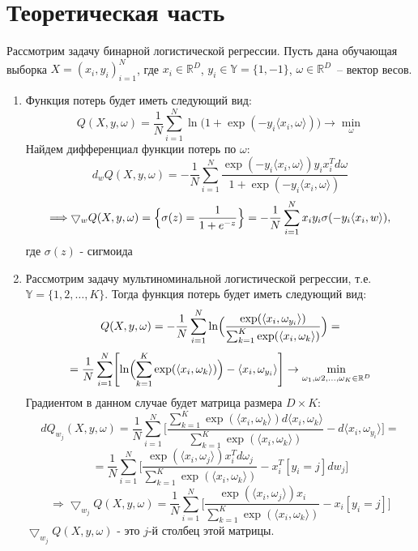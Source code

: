 \section{\huge Теоретическая часть}
Рассмотрим задачу бинарной логистической регрессии. Пусть дана обучающая выборка
$X=(x_i, y_i)_{i=1}^N$, где $x_i \in \mathbb{R}^D$, $ y_i \in \mathbb{Y}=\{ 1, -1\}$, 
$\omega \in \mathbb{R}^D$~-- вектор весов.
\begin{enumerate}
	\item Функция потерь будет иметь следующий вид:
		\[
			Q(X, y, \omega)=\frac{1}{N}\sum_{i=1}^N\ln\bigl(1+\exp(-y_i\langle x_i, \omega\rangle)\bigr)\to \min_{\omega}
		\]
		Найдем дифференциал функции потерь по $\omega$:
		\[
			d_wQ(X, y, \omega)=-\frac{1}{N}\sum_{i=1}^N\frac{\exp(-y_i\langle x_i, \omega\rangle)y_ix_i^Td\omega}
			{1 + \exp(-y_i\langle x_i, \omega\rangle)}
		\]
		$$
			\Longrightarrow \bigtriangledown_wQ(X, y, \omega)=\Bigl\{ \sigma(z) = \frac{1}{ 1+ e^{-z} }\Bigr\}=
			-\frac{1}{N}\sum_{i=1}^Nx_iy_i\sigma(-y_i\langle x_i, w\rangle),
		$$
		где $\sigma(z)$ - сигмоида
	\item Рассмотрим задачу мультиноминальной логистической регрессии, т.е. 
	$\mathbb{Y}=\{1,2,\dots,K\}$. Тогда функция потерь будет иметь следующий вид:
	$$
		Q(X, y, \omega)=-\frac{1}{N}\sum_{i=1}^N\ln\Bigl(\frac{\exp(\langle x_i, 
		\omega_{y_i}\rangle)}{\sum_{k=1}^K\exp(\langle x_i, \omega_k\rangle)}\Bigr)
		=
	$$
	$$
		=\frac{1}{N} \sum_{i=1}^N\Biggl[\ln\Bigl(\sum_{k=1}^K\exp(\langle x_i, \omega_k\rangle)\Bigr)
		- \langle x_i, \omega_{y_i}\rangle\Biggr] \to \min_{\omega_1,\omega2,\dots,\omega_K 
		\in \mathbb{R}^{D}}
	$$
	Градиентом в данном случае будет матрица размера $D \times K$:
	$$
		dQ_{w_j}(X, y, \omega) = \frac{1}{N}\sum_{i=1}^N\Biggl[
			\frac{\sum_{k=1}^K\exp(\langle x_i, \omega_k\rangle)d\langle 
				x_i, \omega_k\rangle}{\sum_{k=1}^K\exp(\langle x_i, \omega_k\rangle)} -
				d\langle x_i,\omega_{y_i}\rangle\Biggr] =
	$$
	$$
		= \frac{1}{N}\sum_{i=1}^N\Biggl[
			\frac{\exp(\langle x_i, \omega_j\rangle)
				x_i^Td\omega_j}{\sum_{k=1}^K\exp(\langle x_i, \omega_k\rangle)} -
				x_i^T[y_i=j]dw_j\Biggr]
	$$
	$$
	\Longrightarrow \bigtriangledown_{w_j}Q(X, y, \omega) = 
		\frac{1}{N}\sum_{i=1}^N\Biggl[
			\frac{\exp(\langle x_i, \omega_j\rangle)
				x_i}{\sum_{k=1}^K\exp(\langle x_i, \omega_k\rangle)} -
				x_i[y_i=j]\Biggr]
	$$
	$\bigtriangledown_{w_j}Q(X, y, \omega)$ - это $j$-й столбец этой матрицы.


\end{enumerate}
